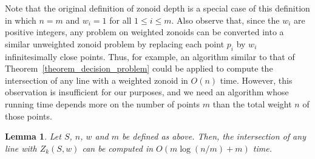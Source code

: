 \documentclass{elsart}
\newtheorem{lemma}{Lemma}
\begin{document}
Note that the original definition of zonoid depth is a special case of
this definition in which $n=m$ and $w_i=1$ for all $1\le i\le m$.
Also observe that, since the $w_i$ are positive integers, any problem
on weighted zonoids can be converted into a similar unweighted zonoid
problem by replacing each point $p_i$ by $w_i$ infinitesimally close
points. Thus, for example, an algorithm similar to that of
Theorem~\ref{theorem_decision_problem} could be applied to compute the
intersection of any line with a weighted zonoid in $O(n)$ time.
However, this observation is insufficient for our purposes, and we
need an algorithm whose running time depends more on the number of
points $m$ than the total weight $n$ of those points.

\begin{lemma}
Let $S$, $n$, $w$ and $m$ be defined as above.  Then, the intersection
of any line with $Z_k(S,w)$ can be computed in $O(m\log (n/m) + m)$
time.
\end{lemma}
\end{document}
